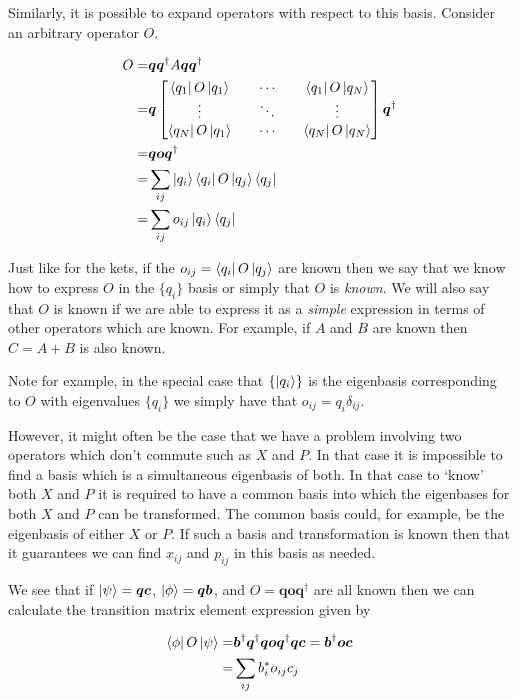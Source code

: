 \documentclass[12pt]{article}
\newcommand{\bv}[1]{\boldsymbol{#1}}
\begin{document}
Similarly, it is possible to expand operators with respect to this basis. Consider an arbitrary operator $O$. 

\begin{align}
O =& \bv{q}\bv{q}^{\dag}A\bv{q}\bv{q}^{\dag} \nonumber \\
=& \bv{q} \begin{bmatrix}
\bra{q_1}O\ket{q_1} && \cdots && \bra{q_1}O\ket{q_N}\\
\vdots && \ddots && \vdots \\
\bra{q_N}O\ket{q_1} && \cdots && \bra{q_N}O\ket{q_N}
\end{bmatrix}\bv{q}^{\dag} \nonumber\\
=& \bv{q} \bv{o}\bv{q}^{\dag} \nonumber\\
=& \sum_{ij} \ket{q_i} \bra{q_i} O \ket{q_j} \bra{q_j} \nonumber\\
=& \sum_{ij} o_{ij} \ket{q_i}\bra{q_j}
\end{align}

Just like for the kets, if the $o_{ij} = \bra{q_i}O\ket{q_j}$ are known then we say that we know how to express $O$ in the $\{q_i\}$ basis or simply that $O$ is \textit{known}. We will also say that $O$ is known if we are able to express it as a \textit{simple} expression in terms of other operators which are known. For example, if $A$ and $B$ are known then $C=A+B$ is also known.

Note for example, in the special case that $\{\ket{q_i}\}$ is the eigenbasis corresponding to $O$ with eigenvalues $\{q_i\}$ we simply have that $o_{ij} = q_i\delta_{ij}$.

However, it might often be the case that we have a problem involving two operators which don't commute such as $X$ and $P$. In that case it is impossible to find a basis which is a simultaneous eigenbasis of both. In that case to `know' both $X$ and $P$ it is required to have a common basis into which the eigenbases for both $X$ and $P$ can be transformed. The common basis could, for example, be the eigenbasis of either $X$ or $P$. If such a basis and transformation is known then that it guarantees we can find $x_{ij}$ and $p_{ij}$ in this basis as needed.

We see that if $\ket{\psi} = \bv{q}\bv{c}$, $\ket{\phi} = \bv{q}\bv{b}$, and $O = \bv{q}\bv{o}\bv{q}^{\dag}$ are all known then we can calculate the transition matrix element expression given by

\begin{align}
\bra{\phi}O\ket{\psi} =& \bv{b}^{\dag}\bv{q}^{\dag}\bv{q}\bv{o}\bv{q}^{\dag}\bv{q}\bv{c} = \bv{b}^{\dag}\bv{o}\bv{c} \nonumber \\
=& \sum_{ij} b_i^*o_{ij}c_j
\end{align}
\end{document}
